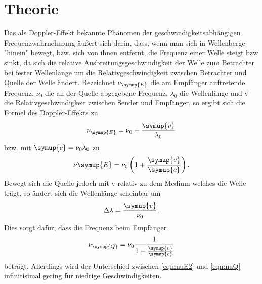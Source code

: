 \section{Theorie}
\label{sec:Theorie}

Das als Doppler-Effekt bekannte Phänomen der geschwindigkeitsabhängigen Frequenzwahrnehmung äußert sich darin, dass, wenn man sich in Wellenberge "hinein" bewegt, bzw. sich von ihnen entfernt, die Frequenz einer Welle steigt bzw sinkt, da sich die relative Ausbreitungsgeschwindigkeit der Welle zum Betrachter bei fester Wellenlänge um die Relativgeschwindigkeit zwischen Betrachter und Quelle der Welle ändert.
Bezeichnet $\nu_{\symup{E}}$ die am Empfänger auftretende Frequenz, $\nu_0$ die an der Quelle abgegebene Frequenz, $\lambda_0$ die Wellenlänge und v die Relativgeschwindigkeit zwischen Sender und Empfänger, so ergibt sich die Formel des Doppler-Effekts zu
\begin{equation}
  \nu_{\symup{E}} = \nu_0 + \frac{\symup{v}}{\lambda_0}
  \label{eqn:nuE1}
\end{equation}
bzw. mit $\symup{c} = \nu_0 \lambda_0$ zu
\begin{equation}
  \nu{\symup{E}} = \nu_0 \left(1+ \frac{\symup{v}}{\symup{c}}\right).
  \label{eqn:nuE2}
\end{equation}
Bewegt sich die Quelle jedoch mit v relativ zu dem Medium welches die Welle trägt, so ändert sich die Wellenlänge scheinbar um
\begin{equation*}
  \Delta \lambda = \frac{\symup{v}}{\nu_0}.
\end{equation*}
Dies sorgt dafür, dass die Frequenz beim Empfänger
\begin{equation}
  \nu_{\symup{Q}} = \nu_0 \frac{1}{1-\frac{\symup{v}}{\symup{c}}}
  \label{eqn:nuQ}
\end{equation}
beträgt. Allerdings wird der Unterschied zwischen \eqref{eqn:nuE2} und \eqref{eqn:nuQ} infinitisimal gering für niedrige Geschwindigkeiten.
